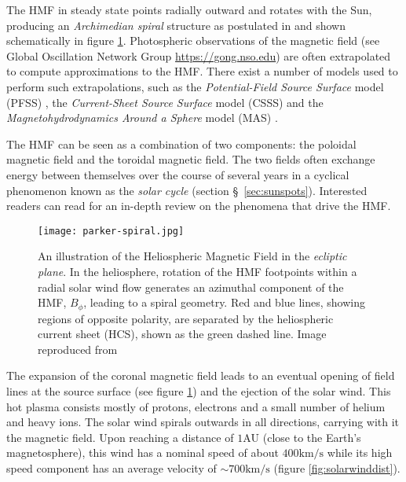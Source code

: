 The HMF in steady state points radially outward and rotates with the Sun, producing an \emph{Archimedian spiral} 
structure as postulated in \cite{parker1958dynamics} and shown schematically in figure \ref{fig:parkerspiral}. 
Photospheric observations of the magnetic field (see Global Oscillation Network Group \url{https://gong.nso.edu}) 
are often extrapolated to compute approximations to the HMF. There exist a number of models used to perform such 
extrapolations, such as the \emph{Potential-Field Source Surface} model (PFSS) 
\citep{schatten1969model,altschuler1969magnetic}, the \emph{Current-Sheet Source Surface} model (CSSS) 
\citep{csss} and the \emph{Magnetohydrodynamics Around a Sphere} model (MAS) 
\citep{linker1999magnetohydrodynamic}. 

The HMF can be seen as a combination of two components: the poloidal magnetic field and the toroidal magnetic field.
The two fields often exchange energy between themselves over the course of several years in a cyclical phenomenon
known as the \emph{solar cycle} (section \S~\ref{sec:sunspots}). Interested readers can read \citep{Owens2013} for an 
in-depth review on the phenomena that drive the HMF.

\begin{figure}
    \noindent\texttt{[image: parker-spiral.jpg]}
    \caption{{\small An illustration of the Heliospheric Magnetic Field in the \emph{ecliptic plane}. 
    In the heliosphere, rotation of the HMF footpoints within a radial solar wind flow generates an azimuthal 
    component of the HMF, $B_{\phi}$, leading to a spiral geometry. Red and blue lines, 
    showing regions of opposite polarity, are separated by the heliospheric current sheet (HCS), 
    shown as the green dashed line.
    Image reproduced from \citet{Owens2013}}}
    \label{fig:parkerspiral}
\end{figure}


The expansion of the coronal magnetic field leads to an eventual opening of field lines at the source surface 
(see figure \ref{fig:parkerspiral}) and the ejection of the solar wind. This hot plasma consists mostly of protons, 
electrons and a small number of helium and heavy ions. The solar wind spirals outwards in all directions, carrying 
with it the magnetic field. Upon reaching a distance of $1 \text{AU}$ (close to the Earth's magnetosphere), this wind 
has a nominal speed of about $400 \text{km}/\text{s}$ while its high speed component has an average velocity of 
$\sim 700 \text{km}/\text{s}$ (figure \ref{fig:solarwinddist}).


